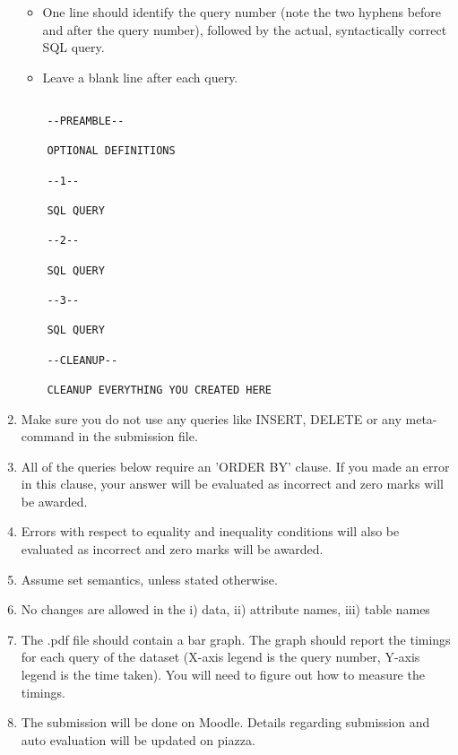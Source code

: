 \documentclass[10pt]{article}
\begin{document}
\begin{enumerate}
\begin{itemize}
    \item One line should identify the query number (note the two hyphens before and after the query number), followed by the actual, syntactically correct SQL query. 
    
    \item Leave a blank line after each query. 
\end{itemize}

\begin{verbatim}
    
    --PREAMBLE--
    
    OPTIONAL DEFINITIONS
    
    --1--
    
    SQL QUERY
    
    --2--
    
    SQL QUERY
    
    --3--
    
    SQL QUERY
    
    --CLEANUP--
    
    CLEANUP EVERYTHING YOU CREATED HERE

\end{verbatim}

\item Make sure you do not use any queries like INSERT, DELETE or any meta-command in the submission file.
    
\item All of the queries below require an 'ORDER BY' clause. If you made an error in this clause, your answer will be evaluated as incorrect and zero marks will be awarded. 

\item Errors with respect to equality and inequality conditions will also be evaluated as incorrect and zero marks will be awarded. 

\item Assume set semantics, unless stated otherwise.

\item No changes are allowed in the i) data, ii) attribute names, iii) table names

\item The .pdf file should contain a bar graph. The graph should report the timings for each query of the dataset (X-axis legend is the query number, Y-axis legend is the time taken). You will need to figure out how to measure the timings.

\item The submission will be done on Moodle. Details regarding submission and auto evaluation will be updated on piazza.
\end{enumerate}
\end{document}
